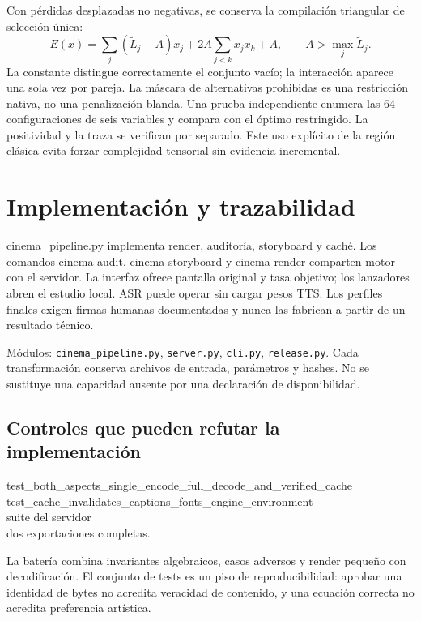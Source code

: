 \documentclass[10pt,a4paper]{article}
\begin{document}
Con pérdidas desplazadas no negativas, se conserva la compilación triangular de selección única:
\begin{equation}
E(x)=\sum_j(\widetilde L_j-A)x_j+2A\sum_{j<k}x_jx_k+A,\qquad A>\max_j\widetilde L_j.
\end{equation}
La constante distingue correctamente el conjunto vacío; la interacción aparece una sola vez por pareja. La máscara de alternativas prohibidas es una restricción nativa, no una penalización blanda. Una prueba independiente enumera las 64 configuraciones de seis variables y compara con el óptimo restringido. La positividad y la traza se verifican por separado. Este uso explícito de la región clásica evita forzar complejidad tensorial sin evidencia incremental.
\section{Implementación y trazabilidad}
cinema\_\allowbreak{}pipeline.py implementa render, auditoría, storyboard y caché. Los comandos cinema-audit, cinema-storyboard y cinema-render comparten motor con el servidor. La interfaz ofrece pantalla original y tasa objetivo; los lanzadores abren el estudio local. ASR puede operar sin cargar pesos TTS. Los perfiles finales exigen firmas humanas documentadas y nunca las fabrican a partir de un resultado técnico.

Módulos: \texttt{cinema\_\allowbreak{}pipeline.py}, \texttt{server.py}, \texttt{cli.py}, \texttt{release.py}. Cada transformación conserva archivos de entrada, parámetros y hashes. No se sustituye una capacidad ausente por una declaración de disponibilidad.
\subsection{Controles que pueden refutar la implementación}
\begin{flushleft}\small test\_\allowbreak{}both\_\allowbreak{}aspects\_\allowbreak{}single\_\allowbreak{}encode\_\allowbreak{}full\_\allowbreak{}decode\_\allowbreak{}and\_\allowbreak{}verified\_\allowbreak{}cache\\ test\_\allowbreak{}cache\_\allowbreak{}invalidates\_\allowbreak{}captions\_\allowbreak{}fonts\_\allowbreak{}engine\_\allowbreak{}environment\\ suite del servidor\\ dos exportaciones completas.\end{flushleft}

La batería combina invariantes algebraicos, casos adversos y render pequeño con decodificación. El conjunto de tests es un piso de reproducibilidad: aprobar una identidad de bytes no acredita veracidad de contenido, y una ecuación correcta no acredita preferencia artística.
\end{document}
